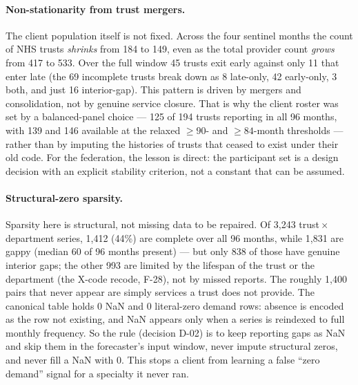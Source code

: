 \documentclass[11pt,a4paper]{article}
\begin{document}
\paragraph{Non-stationarity from trust mergers.} The client population itself is not fixed. Across the four sentinel months the count of NHS trusts \emph{shrinks} from 184 to 149, even as the total provider count \emph{grows} from 417 to 533. Over the full window 45 trusts exit early against only 11 that enter late (the 69 incomplete trusts break down as 8 late-only, 42 early-only, 3 both, and just 16 interior-gap). This pattern is driven by mergers and consolidation, not by genuine service closure. That is why the client roster was set by a balanced-panel choice --- 125 of 194 trusts reporting in all 96 months, with 139 and 146 available at the relaxed $\geq 90$- and $\geq 84$-month thresholds --- rather than by imputing the histories of trusts that ceased to exist under their old code. For the federation, the lesson is direct: the participant set is a design decision with an explicit stability criterion, not a constant that can be assumed.

\paragraph{Structural-zero sparsity.} Sparsity here is structural, not missing data to be repaired. Of 3{,}243 trust\,$\times$\,department series, 1{,}412 (44\%) are complete over all 96 months, while 1{,}831 are gappy (median 60 of 96 months present) --- but only 838 of those have genuine interior gaps; the other 993 are limited by the lifespan of the trust or the department (the X-code recode, F-28), not by missed reports. The roughly 1{,}400 pairs that never appear are simply services a trust does not provide. The canonical table holds 0 NaN and 0 literal-zero demand rows: absence is encoded as the row not existing, and NaN appears only when a series is reindexed to full monthly frequency. So the rule (decision D-02) is to keep reporting gaps as NaN and skip them in the forecaster's input window, never impute structural zeros, and never fill a NaN with 0. This stops a client from learning a false ``zero demand'' signal for a specialty it never ran.
\end{document}
